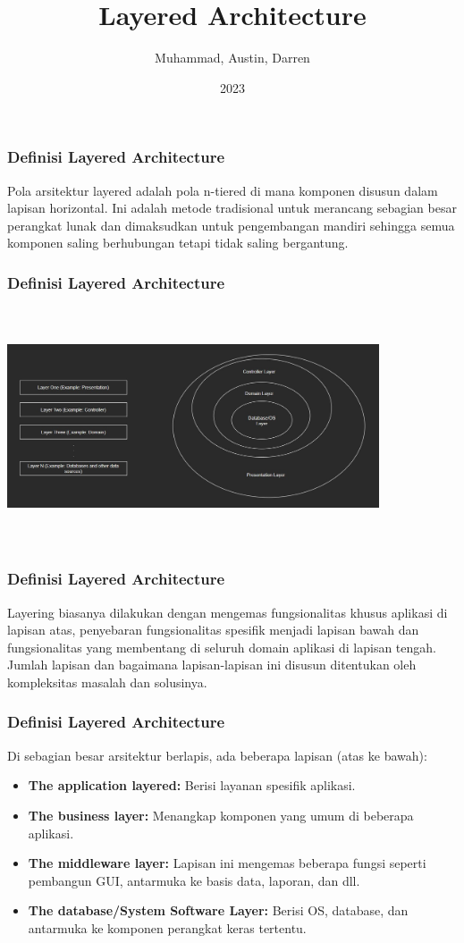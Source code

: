 \documentclass{beamer}
\title{Layered Architecture}
\author{Muhammad, Austin, Darren}
\institute{Pradita University}
\date{2023}
\begin{document}
\frame{\titlepage}

\begin{frame}
\frametitle{Definisi Layered Architecture}
Pola arsitektur layered adalah pola n-tiered di mana komponen disusun dalam lapisan horizontal. Ini adalah metode tradisional untuk merancang sebagian besar perangkat lunak dan dimaksudkan untuk pengembangan mandiri sehingga semua komponen saling berhubungan tetapi tidak saling bergantung.
\end{frame}

\begin{frame}
\frametitle{Definisi Layered Architecture}
\includegraphics[width=11cm,height=7cm]{../../images/Layering Architecture}

\end{frame}

\begin{frame}
\frametitle{Definisi Layered Architecture}
Layering biasanya dilakukan dengan mengemas fungsionalitas khusus aplikasi di lapisan atas, penyebaran fungsionalitas spesifik menjadi lapisan bawah dan fungsionalitas yang membentang di seluruh domain aplikasi di lapisan tengah. Jumlah lapisan dan bagaimana lapisan-lapisan ini disusun ditentukan oleh kompleksitas masalah dan solusinya.
\end{frame}

\begin{frame}
\frametitle{Definisi Layered Architecture}
Di sebagian besar arsitektur berlapis, ada beberapa lapisan (atas ke bawah):
\begin{itemize}
	\item \textbf{The application layered:} Berisi layanan spesifik aplikasi.
	\item \textbf{The business layer:} Menangkap komponen yang umum di beberapa aplikasi.
	\item \textbf{The middleware layer:} Lapisan ini mengemas beberapa fungsi seperti pembangun GUI, antarmuka ke basis data, laporan, dan dll.
	\item \textbf{The database/System Software Layer:} Berisi OS, database, dan antarmuka ke komponen perangkat keras tertentu.
\end{itemize}
\end{frame}
\end{document}
